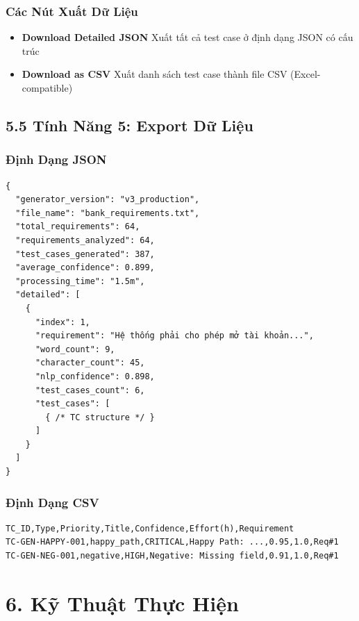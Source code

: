 \documentclass[14pt,a4paper]{article}
\begin{document}
\subsubsection{Các Nút Xuất Dữ Liệu}

\begin{itemize}
    \item \textbf{Download Detailed JSON}
    Xuất tất cả test case ở định dạng JSON có cấu trúc
    
    \item \textbf{Download as CSV}
    Xuất danh sách test case thành file CSV (Excel-compatible)
\end{itemize}

\subsection{5.5 Tính Năng 5: Export Dữ Liệu}

\subsubsection{Định Dạng JSON}
\begin{lstlisting}
{
  "generator_version": "v3_production",
  "file_name": "bank_requirements.txt",
  "total_requirements": 64,
  "requirements_analyzed": 64,
  "test_cases_generated": 387,
  "average_confidence": 0.899,
  "processing_time": "1.5m",
  "detailed": [
    {
      "index": 1,
      "requirement": "Hệ thống phải cho phép mở tài khoản...",
      "word_count": 9,
      "character_count": 45,
      "nlp_confidence": 0.898,
      "test_cases_count": 6,
      "test_cases": [
        { /* TC structure */ }
      ]
    }
  ]
}
\end{lstlisting}

\subsubsection{Định Dạng CSV}
\begin{lstlisting}
TC_ID,Type,Priority,Title,Confidence,Effort(h),Requirement
TC-GEN-HAPPY-001,happy_path,CRITICAL,Happy Path: ...,0.95,1.0,Req#1
TC-GEN-NEG-001,negative,HIGH,Negative: Missing field,0.91,1.0,Req#1
\end{lstlisting}

\section{6. Kỹ Thuật Thực Hiện}
\end{document}
